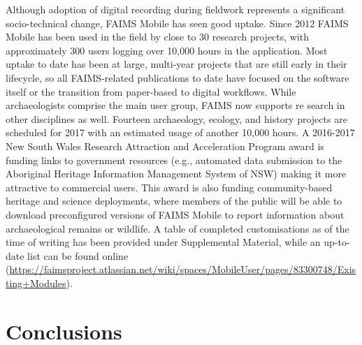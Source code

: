 \documentclass[preprint,12pt, a4paper]{elsarticle}
\begin{document}
Although adoption of digital recording during fieldwork represents a significant socio-technical change, FAIMS Mobile has seen good uptake. Since 2012 FAIMS Mobile has been used in the field by close to 30 research projects, with approximately 300 users logging over 10,000 hours in the application. Most uptake to date has been at large, multi-year projects that are still early in their lifecycle, so all FAIMS-related publications to date have focused on the software itself or the transition from paper-based to digital workflows. While archaeologists comprise the main user group, FAIMS now supports re search in other disciplines as well. Fourteen archaeology, ecology, and history projects are scheduled for 2017 with an estimated usage of another 10,000 hours. A 2016-2017 New South Wales Research Attraction and Acceleration Program award is funding links to government resources (e.g., automated data submission to the Aboriginal Heritage Information Management System of NSW) making it more attractive to commercial users. This award is also funding community-based heritage and science deployments, where members of the public will be able to download preconfigured versions of FAIMS Mobile to report information about archaeological remains or wildlife. A table of completed customisations as of the time of writing has been provided under Supplemental Material, while an up-to-date list can be found online (\url{https://faimsproject.atlassian.net/wiki/spaces/MobileUser/pages/83300748/Existing+Modules}).


\section{Conclusions}
\end{document}
